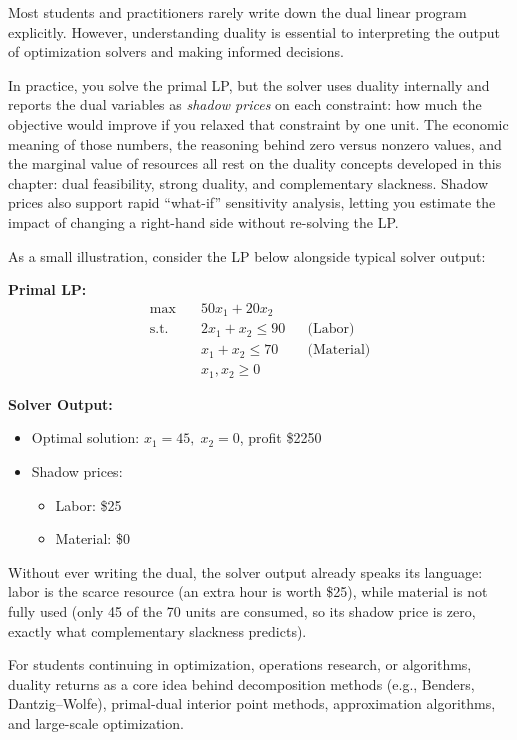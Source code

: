 Most students and practitioners rarely write down the dual linear program explicitly.
However, understanding duality is essential to interpreting the output of optimization solvers
and making informed decisions.

In practice, you solve the primal LP, but the solver uses duality internally and reports the dual variables as \emph{shadow prices} on each constraint: how much the objective would improve if you relaxed that constraint by one unit.  The economic meaning of those numbers, the reasoning behind zero versus nonzero values, and the marginal value of resources all rest on the duality concepts developed in this chapter: dual feasibility, strong duality, and complementary slackness.  Shadow prices also support rapid ``what-if'' sensitivity analysis, letting you estimate the impact of changing a right-hand side without re-solving the LP.

As a small illustration, consider the LP below alongside typical solver output:

\medskip

\begin{minipage}{0.48\textwidth}
\textbf{Primal LP:}
\[
\begin{aligned}
\max\quad & 50x_1 + 20x_2 \\
\text{s.t.} \quad
& 2x_1 + x_2 \le 90 && \text{(Labor)} \\
& x_1 + x_2 \le 70 && \text{(Material)} \\
& x_1, x_2 \ge 0
\end{aligned}
\]
\end{minipage}
\hfill
\begin{minipage}{0.48\textwidth}
\textbf{Solver Output:}
\begin{itemize}
    \item Optimal solution: \( x_1 = 45,\; x_2 = 0 \), profit \$2250
    \item Shadow prices:
    \begin{itemize}
        \item Labor: \$25
        \item Material: \$0
    \end{itemize}
\end{itemize}
\end{minipage}

\medskip

Without ever writing the dual, the solver output already speaks its language: labor is the scarce resource (an extra hour is worth \$25), while material is not fully used (only 45 of the 70 units are consumed, so its shadow price is zero, exactly what complementary slackness predicts).

For students continuing in optimization, operations research, or algorithms, duality returns as a core idea behind decomposition methods (e.g., Benders, Dantzig--Wolfe), primal-dual interior point methods, approximation algorithms, and large-scale optimization.

